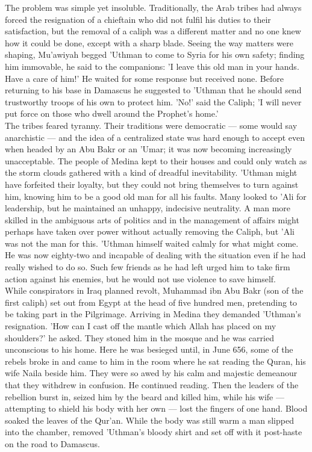 \documentclass[10pt, twoside]{book}
\begin{document}
The problem was simple yet insoluble. Traditionally, the Arab tribes had always forced the resignation of a chieftain who did not fulfil his duties to their satisfaction, but the removal of a caliph was a different matter and no one knew how it could be done, except with a sharp blade. Seeing the way matters were shaping, Mu'awiyah begged 'Uthman to come to Syria for his own safety; finding him immovable, he said to the companions: 'I leave this old man in your hands. Have a care of him!' He waited for some response but received none. Before returning to his base in Damascus he suggested to 'Uthman that he should send trustworthy troops of his own to protect him. 'No!' said the Caliph; 'I will never put force on those who dwell around the Prophet's home.' \\

The tribes feared tyranny. Their traditions were democratic --- some would say anarchistic --- and the idea of a centralized state was hard enough to accept even when headed by an Abu Bakr or an 'Umar; it was now becoming increasingly unacceptable. The people of Medina kept to their houses and could only watch as the storm clouds gathered with a kind of dreadful inevitability. 'Uthman might have forfeited their loyalty, but they could not bring themselves to turn against him, knowing him to be a good old man for all his faults. Many looked to 'Ali for leadership, but he maintained an unhappy, indecisive neutrality. A man more skilled in the ambiguous arts of politics and in the management of affairs might perhaps have taken over power without actually removing the Caliph, but 'Ali was not the man for this. 'Uthman himself waited calmly for what might come. He was now eighty-two and incapable of dealing with the situation even if he had really wished to do so. Such few friends as he had left urged him to take firm action against his enemies, but he would not use violence to save himself. \\

While conspirators in Iraq planned revolt, Muhammad ibn Abu Bakr (son of the first caliph) set out from Egypt at the head of five hundred men, pretending to be taking part in the Pilgrimage. Arriving in Medina they demanded 'Uthman's resignation. 'How can I cast off the mantle which Allah has placed on my shoulders?' he asked. They stoned him in the mosque and he was carried unconscious to his home. Here he was besieged until, in June 656, some of the rebels broke in and came to him in the room where he sat reading the Quran, his wife Naila beside him. They were so awed by his calm and majestic demeanour that they withdrew in confusion. He continued reading. Then the leaders of the rebellion burst in, seized him by the beard and killed him, while his wife --- attempting to shield his body with her own --- lost the fingers of one hand. Blood soaked the leaves of the Qur'an. While the body was still warm a man slipped into the chamber, removed 'Uthman's bloody shirt and set off with it post\hyp{}haste on the road to Damascus. \\
\end{document}
